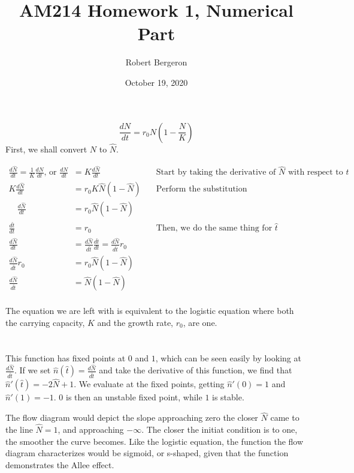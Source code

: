 \documentclass{article}
\title{AM214 Homework 1, Numerical Part}
\author{Robert Bergeron}
\date{October 19, 2020}
\begin{document}
\maketitle

\section{}
\[ \frac{dN}{dt} = r_0N(1- \frac{N}{K}) \]
First, we shall convert \(N\) to \(\hat{N}\).

\begin{align*}
    \frac{d\hat{N}}{dt} = \frac{1}{K}\frac{dN}{dt} \text{, or } \frac{dN}{dt} & = K\frac{d\hat{N}}{dt}
    & \quad \text{Start by taking the derivative of \(\hat{N}\) with respect to \(t\)} \\
    K\frac{d\hat{N}}{dt} & = r_0K\hat{N}(1 - \hat{N})
    & \quad \text{Perform the substitution} \\
    \quad \frac{d\hat{N}}{dt} & = r_0\hat{N}(1 - \hat{N}) \\
    \frac{d\hat{t}}{dt} & = r_0
    & \quad \text{Then, we do the same thing for \(\hat{t}\)} \\
    \frac{d\hat{N}}{dt} & = \frac{d\hat{N}}{d\hat{t}}\frac{d\hat{t}}{dt} = \frac{d\hat{N}}{d\hat{t}}r_0 \\
    \frac{d\hat{N}}{d\hat{t}}r_0 & = r_0\hat{N}(1 - \hat{N}) \\
    \frac{d\hat{N}}{d\hat{t}} & = \hat{N}(1 - \hat{N}) \\
\end{align*}

The equation we are left with is equivalent to the logistic equation where both
the carrying capacity, \(K\) and the growth rate, \(r_0\), are one.

\section{}
This function has fixed points at \(0\) and \(1\), which can be seen easily
by looking at \(\frac{d\hat{N}}{d\hat{t}}\). If we set
\(\hat{n}(\hat{t}) = \frac{d\hat{N}}{d\hat{t}}\) and take the derivative of this
function, we find that \(\hat{n}'(\hat{t}) = -2\hat{N} + 1\). We evaluate at
the fixed points, getting \(\hat{n}'(0) = 1\) and \(\hat{n}'(1) = -1\). \(0\)
is then an unstable fixed point, while \(1\) is stable.

The flow diagram would depict the slope approaching zero the closer \(\hat{N}\)
came to the line \(\hat{N} = 1\), and approaching \(-\infty\). The closer the
initiat condition is to one, the smoother the curve becomes. Like the logistic
equation, the function the flow diagram characterizes would be sigmoid, or s-shaped,
given that the function demonstrates the Allee effect.
\end{document}
